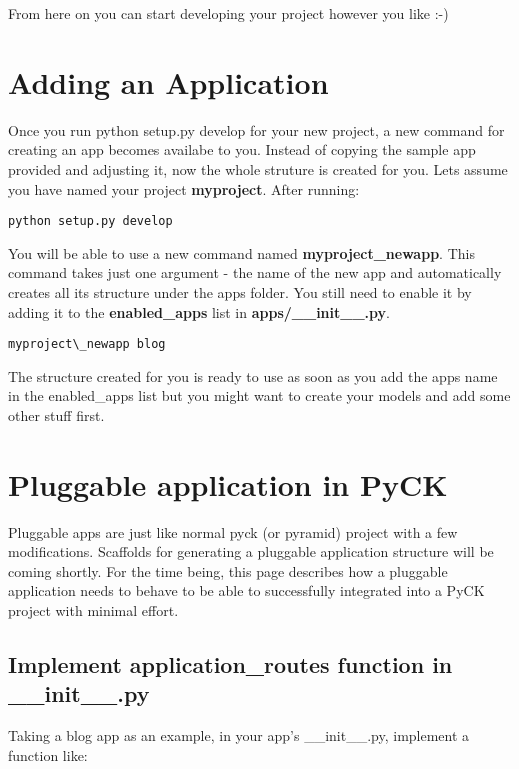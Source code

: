 \documentclass[letterpaper,10pt,english]{sphinxmanual}
\begin{document}
From here on you can start developing your project however you like :-)


\chapter{Adding an Application}
\label{adding-apps:adding-an-application}\label{adding-apps:adding-apps}\label{adding-apps::doc}
Once you run python setup.py develop for your new project, a new command for creating an app becomes availabe to you. Instead of copying the sample app provided and adjusting it, now the whole struture is created for you. Lets assume you have named your project \textbf{myproject}. After running:

\begin{Verbatim}[commandchars=\\\{\}]
python setup.py develop
\end{Verbatim}

You will be able to use a new command named \textbf{myproject\_newapp}. This command takes just one argument - the name of the new app and automatically creates all its structure under the apps folder. You still need to enable it by adding it to the \textbf{enabled\_apps} list in \textbf{apps/\_\_init\_\_.py}.

\begin{Verbatim}[commandchars=\\\{\}]
myproject\_newapp blog
\end{Verbatim}

The structure created for you is ready to use as soon as you add the apps name in the enabled\_apps list but you might want to create your models and add some other stuff first.


\chapter{Pluggable application in PyCK}
\label{pluggable-apps-howto:pluggable-application-in-pyck}\label{pluggable-apps-howto:pluggable-apps}\label{pluggable-apps-howto::doc}
Pluggable apps are just like normal pyck (or pyramid) project with a few modifications. Scaffolds for generating a pluggable application structure will be coming shortly. For the time being, this page describes how a pluggable application needs to behave to be able to successfully integrated into a PyCK project with minimal effort.


\section{Implement application\_routes function in \_\_init\_\_.py}
\label{pluggable-apps-howto:implement-application-routes-function-in-init-py}
Taking a blog app as an example, in your app's \_\_init\_\_.py, implement a function like:
\end{document}
